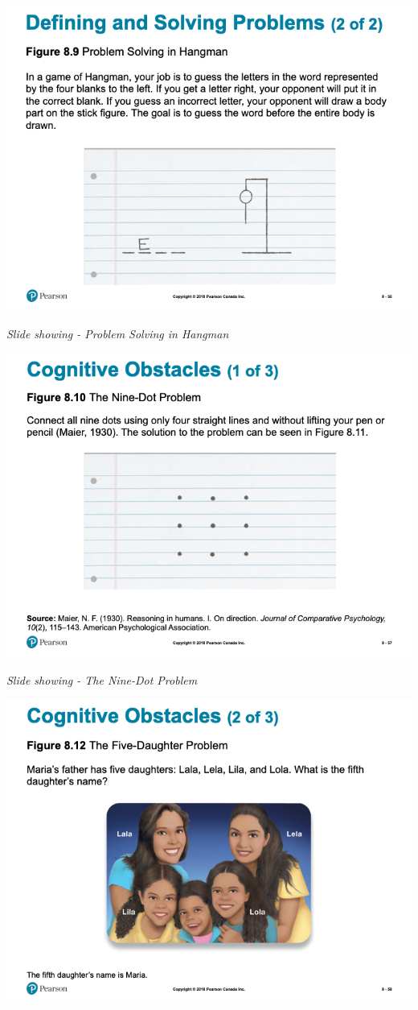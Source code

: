 \documentclass[
]{book}
\begin{document}
\includegraphics{assets/unit_1/slide_56.png}

\emph{Slide showing - Problem Solving in Hangman}

\includegraphics{assets/unit_1/slide_57.png}

\emph{Slide showing - The Nine-Dot Problem}

\includegraphics{assets/unit_1/slide_58.png}
\end{document}
